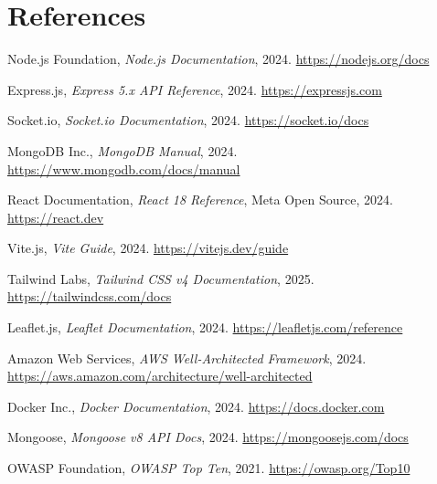 \documentclass[12pt, a4paper]{report}
\begin{document}
\chapter*{References}

\begin{enumerate}[label={[\arabic*]}]
  \item Node.js Foundation, \textit{Node.js Documentation}, 2024. \url{https://nodejs.org/docs}
  \item Express.js, \textit{Express 5.x API Reference}, 2024. \url{https://expressjs.com}
  \item Socket.io, \textit{Socket.io Documentation}, 2024. \url{https://socket.io/docs}
  \item MongoDB Inc., \textit{MongoDB Manual}, 2024. \url{https://www.mongodb.com/docs/manual}
  \item React Documentation, \textit{React 18 Reference}, Meta Open Source, 2024. \url{https://react.dev}
  \item Vite.js, \textit{Vite Guide}, 2024. \url{https://vitejs.dev/guide}
  \item Tailwind Labs, \textit{Tailwind CSS v4 Documentation}, 2025. \url{https://tailwindcss.com/docs}
  \item Leaflet.js, \textit{Leaflet Documentation}, 2024. \url{https://leafletjs.com/reference}
  \item Amazon Web Services, \textit{AWS Well-Architected Framework}, 2024. \url{https://aws.amazon.com/architecture/well-architected}
  \item Docker Inc., \textit{Docker Documentation}, 2024. \url{https://docs.docker.com}
  \item Mongoose, \textit{Mongoose v8 API Docs}, 2024. \url{https://mongoosejs.com/docs}
  \item OWASP Foundation, \textit{OWASP Top Ten}, 2021. \url{https://owasp.org/Top10}
\end{enumerate}
\end{document}
